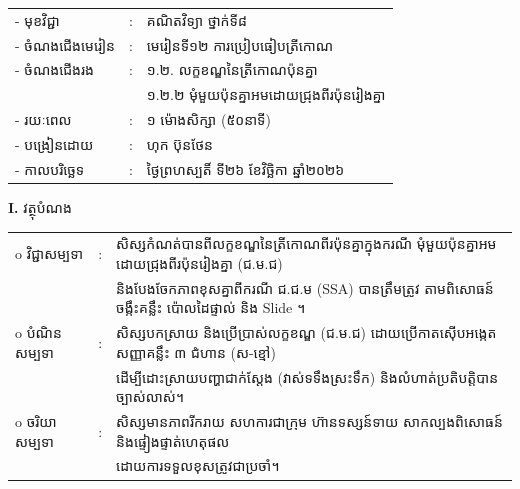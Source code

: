 \documentclass[a4paper,10pt]{article}
\newcommand{\wcirc}{{\CourierBullet\fontsize{9.5pt}{11pt}\selectfont o}}
\begin{document}
{\renewcommand{\arraystretch}{0.92}
\hspace*{4.6cm}%
\begin{tabular}{@{}l l l@{}}
  - \hspace{0.35cm} មុខវិជ្ជា & : & គណិតវិទ្យា ថ្នាក់ទី៨ \\
  - \hspace{0.35cm} ចំណងជើងមេរៀន & : & មេរៀនទី១២ ការប្រៀបធៀបត្រីកោណ \\
  - \hspace{0.35cm} ចំណងជើងរង & : & ១.២. លក្ខខណ្ឌនៃត្រីកោណប៉ុនគ្នា \\
  & & ១.២.២ មុំមួយប៉ុនគ្នាអមដោយជ្រុងពីរប៉ុនរៀងគ្នា \\
  - \hspace{0.35cm} រយៈពេល & : & ១ ម៉ោងសិក្សា (៥០នាទី) \\
  - \hspace{0.35cm} បង្រៀនដោយ & : & ហុក ប៊ុនថែន \\
  - \hspace{0.35cm} កាលបរិច្ឆេទ & : & ថ្ងៃព្រហស្បតិ៍ ទី២៦ ខែវិច្ឆិកា ឆ្នាំ២០២៦ \\
\end{tabular}

\vspace{0pt}

\textbf{I.} {\muol វត្ថុបំណង}\\[1pt]
\hspace*{0.55cm}%
\begin{tabular}{@{}l l l@{}}
  \wcirc \hspace{0.25cm} វិជ្ជាសម្បទា & : & សិស្សកំណត់បានពីលក្ខខណ្ឌនៃត្រីកោណពីរប៉ុនគ្នាក្នុងករណី មុំមួយប៉ុនគ្នាអមដោយជ្រុងពីរប៉ុនរៀងគ្នា (ជ.ម.ជ) \\
  & & និងបែងចែកភាពខុសគ្នាពីករណី ជ.ជ.ម (SSA) បានត្រឹមត្រូវ តាមពិសោធន៍ចង្កឹះគន្លឹះ ប៉ោលដៃផ្ទាល់ និង Slide ។ \\
  \wcirc \hspace{0.25cm} បំណិនសម្បទា & : & សិស្សបកស្រាយ និងប្រើប្រាស់លក្ខខណ្ឌ (ជ.ម.ជ) ដោយប្រើកាតស៊ើបអង្កេតសញ្ញាគន្លឹះ ៣ ជំហាន (ស-ខ្មៅ) \\
  & & ដើម្បីដោះស្រាយបញ្ហាជាក់ស្ដែង (វាស់ទទឹងស្រះទឹក) និងលំហាត់ប្រតិបត្តិបានច្បាស់លាស់។ \\
  \wcirc \hspace{0.25cm} ចរិយាសម្បទា & : & សិស្សមានភាពរីករាយ សហការជាក្រុម ហ៊ានទស្សន៍ទាយ សាកល្បងពិសោធន៍ និងផ្ទៀងផ្ទាត់ហេតុផល \\
  & & ដោយការទទួលខុសត្រូវជាប្រចាំ។ \\
\end{tabular}

}
\end{document}
